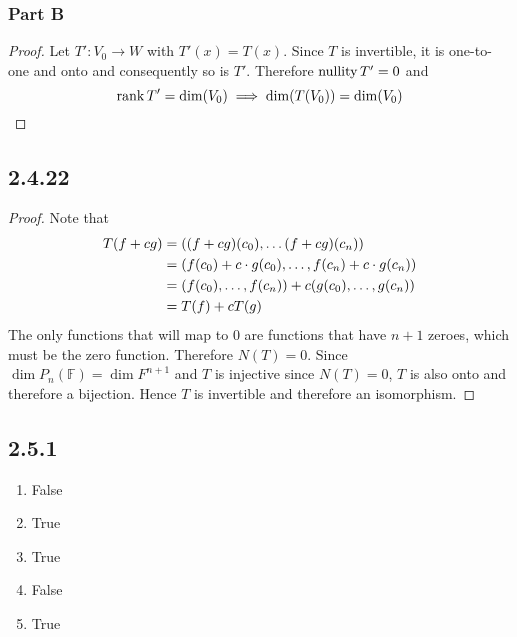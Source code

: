 \documentclass[12pt,titlepage]{extarticle}
\begin{document}
\subsubsection*{Part B}
\begin{proof}
    Let $T': V_0 \to W$ with $T'(x) = T(x)$. Since $T$ is invertible, it is one-to-one and onto and consequently so is $T'$. Therefore $\operatorname{nullity} T' = 0$ and
    \[
        \rank T' = \dim(V_0) \implies \dim(T(V_0)) = \dim(V_0)
    \]
\end{proof}

\subsection*{2.4.22}
\begin{proof}
    Note that
    \begin{align*}
        T(f + cg) &= \qty((f+cg)(c_0), \ldots (f+cg)(c_n)) \\
                  &= \qty(f(c_0) + c\cdot g(c_0), \ldots, f(c_n) + c\cdot g(c_n)) \\
                  &= \qty(f(c_0), \ldots, f(c_n)) + c\qty(g(c_0), \ldots, g(c_n)) \\
                  &= T(f) + cT(g)
    \end{align*}
    The only functions that will map to $0$ are functions that have $n+1$ zeroes, which must be the zero function. Therefore $N(T) = \qty{0}$. Since $\dim P_n (\mathbb{F}) = \dim F^{n+1}$ and $T$ is injective since $N(T) = \qty{0}$, $T$ is also onto and therefore a bijection. Hence $T$ is invertible and therefore an isomorphism.
\end{proof}

\subsection*{2.5.1}
\begin{enumerate}[label=\alph*)]
    \item False
    \item True
    \item True
    \item False
    \item True
\end{enumerate}
\end{document}
